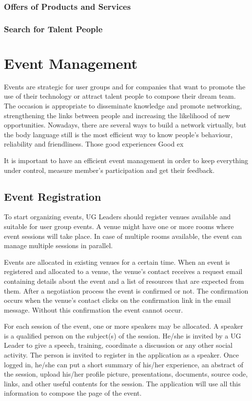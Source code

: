 \documentclass[envcountsame,envcountchap]{svmono}
\begin{document}
\subsection{Offers of Products and Services}

\subsection{Search for Talent People}

\chapter{Event Management}
\label{chp:event-management}

Events are strategic for user groups and for companies that want to promote the use of their technology or attract talent people to compose their dream team. The occasion is appropriate to disseminate knowledge and promote networking, strengthening the links between people and increasing the likelihood of new opportunities. Nowadays, there are several ways to build a network virtually, but the body language still is the most efficient way to know people's behaviour, reliability and friendliness. Those good experiences Good ex

It is important to have an efficient event management in order to keep everything under control, measure member's participation and get their feedback.

\section{Event Registration}

To start organizing events, UG Leaders should register venues available and suitable for user group events. A venue might have one or more rooms where event sessions will take place. In case of multiple rooms available, the event can manage multiple sessions in parallel.

Events are allocated in existing venues for a certain time. When an event is registered and allocated to a venue, the venue's contact receives a request email containing details about the event and a list of resources that are expected from them. After a negotiation process the event is confirmed or not. The confirmation occurs when the venue's contact clicks on the confirmation link in the email message. Without this confirmation the event cannot occur.

For each session of the event, one or more speakers may be allocated. A speaker is a qualified person on the subject(s) of the session. He/she is invited by a UG Leader to give a speech, training, coordinate a discussion or any other social activity. The person is invited to register in the application as a speaker.  Once logged in, he/she can put a short summary of his/her experience, an abstract of the session, upload his/her profile picture, presentations, documents, source code, links, and other useful contents for the session. The application will use all this information to compose the page of the event.
\end{document}
